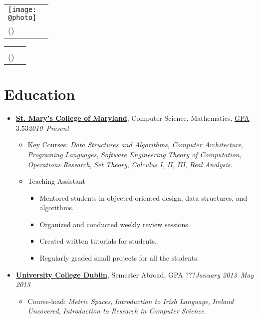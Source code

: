 \documentclass[11pt,letterpaper]{article}
\author{Sean Edward Allred}
\makeatletter
\newcommand{\position}[5]{\item%
  \begin{tabular*}{1.0\linewidth}{l@{\extracolsep{\fill}}r}
    #1 & #2\\
    \textit{#3} & \textit{#4---#5}
  \end{tabular*}}
\renewcommand{\position}[5]{\item%
  \textbf{#1}, #3, #2\hfill \textit{#4--#5}
}
\renewcommand{\maketitle}{%
  \noindent
  \ifdefined\@photo
  \usepackage{multirow}
  \begin{tabular*}{1.0\linewidth}{l@{\extracolsep{\fill}}r}
    \multirow{2}{*}{\texttt{[image: \\@photo]}}\\
     {\@namestyle\@author}           & \@addressA\\
    {\@emailstyle\@email} (\@phone)  & \@addressB
  \end{tabular*}
  \else
  \begin{tabular*}{1.0\linewidth}{l@{\extracolsep{\fill}}r}
     {\@namestyle\@author}           & \@addressA\\
    {\@emailstyle\@email} (\@phone)  & \@addressB
  \end{tabular*}
  \fi
}
\newcommand{\course}[1]{\textit{#1}}
\makeatother
\begin{document}
\maketitle

\section*{Education}
\begin{itemize}
\position {\href{http://www.smcm.edu}
                {St. Mary's College of Maryland}}
          {\href{http://dl.dropbox.com/u/17471132/transcript20130330.pdf}
                {GPA $3.53$}}
          {Computer Science, Mathematics}
          {2010}{Present}
          \begin{itemize}
          \item Key Courses: \course{Data Structures and Algorithms},
            \course{Computer Architecture}, \course{Programing
              Languages}, \course{Software Engineering} \course{Theory
              of Computation}, \course{Operations Research},
            \course{Set Theory}, \course{Calculus I, II, III},
            \course{Real Analysis}.
          \item Teaching Assistant
            \begin{itemize}
            \item Mentored students in objected-oriented design, data
              structures, and algorithms.
            \item Organized and conducted weekly review sessions.
            \item Created written tutorials for students.
            \item Regularly graded small projects for all the students.
            \end{itemize}
          \end{itemize}

\position {\href{http://www.ucd.ie}
                {University College Dublin}}
          {GPA ???} %
          {Semester Abroad}
          {January 2013}{May 2013}
          \begin{itemize}
          \item Course-load: \course{Metric Spaces},
            \course{Introduction to Irish Language}, \course{Ireland
              Uncovered}, \course{Introduction to Research in Computer
              Science}.
          \end{itemize}
\end{itemize}
\end{document}
